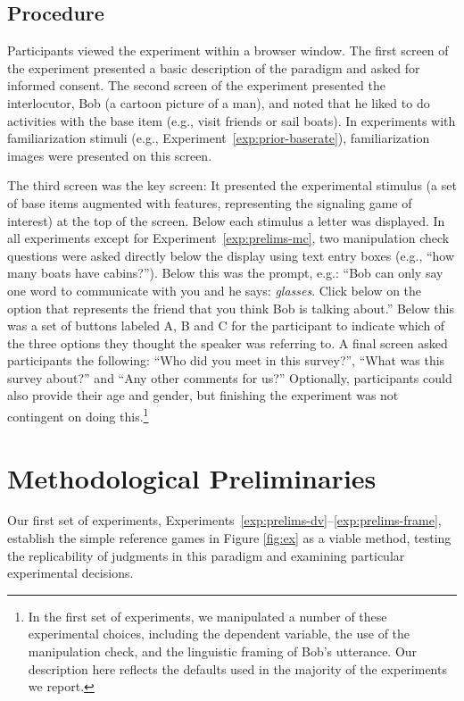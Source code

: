 \documentclass[man]{apa6}
\newcounter{Experiment}
\newcommand{\exptref}[1]{Experiment~\ref{#1}}
\newcommand{\exptrefrange}[2]{Experiments~\ref{#1}--\ref{#2}}
\begin{document}
\subsection{Procedure}

Participants viewed the experiment within a browser window. The first screen of the experiment presented a basic description of the paradigm and asked for informed consent. The second screen of the experiment presented the interlocutor, Bob (a cartoon picture of a man), and noted that he liked to do activities with the base item (e.g., visit friends or sail boats). In experiments with familiarization stimuli (e.g., \exptref{exp:prior-baserate}),  familiarization images were presented on this screen.

The third screen was the key screen: It presented the experimental stimulus (a set of base items augmented with features, representing the signaling game of interest) at the top of the screen. Below each stimulus a letter was displayed.
In all experiments except for \exptref{exp:prelims-mc}, two manipulation check questions were asked directly below the display using text entry boxes (e.g., ``how many boats have cabins?''). Below this was the prompt, e.g.: ``Bob can only say one word to communicate with you and he says: {\it glasses}. Click below on the option that represents the friend that you think Bob is talking about.'' Below this was a set of buttons labeled A, B and C for the participant to indicate which of the three options they thought the speaker was referring to. A final screen asked participants the following: ``Who did you meet in this survey?'',  ``What was this survey about?'' and ``Any other comments for us?'' Optionally, participants could also provide their age and gender, but finishing the experiment was not contingent on doing this.\footnote{In the first set of experiments, we manipulated a number of these experimental choices, including the dependent variable, the use of the manipulation check, and the linguistic framing of Bob's utterance. Our description here reflects the defaults used in the majority of the experiments we report.}

\section{Methodological Preliminaries}
\label{sec:prelims}

Our first set of experiments, \exptrefrange{exp:prelims-dv}{exp:prelims-frame}, establish the simple reference games in Figure \ref{fig:ex} as a viable method, testing the replicability of judgments in this paradigm and examining particular experimental decisions.
\end{document}
